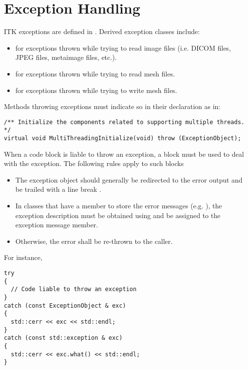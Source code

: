 \section{Exception Handling}
\label{sec:ExceptionHandling}

ITK exceptions are defined in . Derived exception
classes include:
\begin{itemize}
\item {} for exceptions thrown while trying to
read image files (i.e. DICOM files, JPEG files, metaimage files, etc.).
\item {} for exceptions thrown while trying to
read mesh files.
\item {} for exceptions thrown while trying to
write mesh files.
\end{itemize}

Methods throwing exceptions must indicate so in their declaration as in:

\small
\begin{verbatim}
/** Initialize the components related to supporting multiple threads. */
virtual void MultiThreadingInitialize(void) throw (ExceptionObject);
\end{verbatim}
\normalsize

When a code block is liable to throw an exception, a  block must
be used to deal with the exception. The following rules apply to such blocks
\begin{itemize}
\item The exception object should generally be redirected to the error output
 and be trailed with a line break .
\item In classes that have a member to store the error messages (e.g.
), the exception description must be obtained using
 and be assigned to the exception message member.
\item Otherwise, the error shall be re-thrown to the caller.
\end{itemize}

For instance,

\small
\begin{verbatim}
try
{
  // Code liable to throw an exception
}
catch (const ExceptionObject & exc)
{
  std::cerr << exc << std::endl;
}
catch (const std::exception & exc)
{
  std::cerr << exc.what() << std::endl;
}
\end{verbatim}
\normalsize


